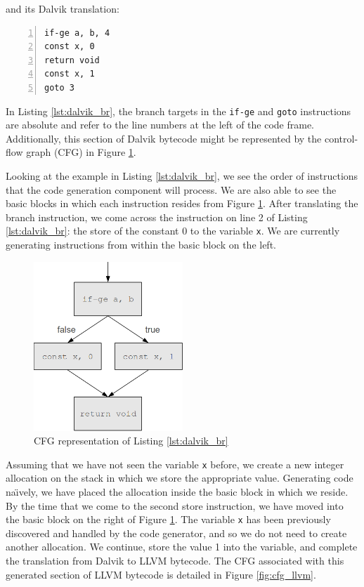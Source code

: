 and its Dalvik translation:

\lstset{
	language=Assembly,
	basicstyle=\small,
	stringstyle=\ttfamily
}

\begin{lstlisting}[frame=single, numbers=left, numberstyle=\tiny, caption={Dalvik code for Listing \ref{lst:java_br}}, label=lst:dalvik_br]
if-ge a, b, 4
const x, 0
return void
const x, 1
goto 3
\end{lstlisting}

In Listing \ref{lst:dalvik_br}, the branch targets in the \verb|if-ge| and \verb|goto| instructions are absolute and refer to the line numbers at the left of the code frame. Additionally, this section of Dalvik bytecode might be represented by the control-flow graph (CFG) in Figure \ref{fig:cfg_dalvik}.

Looking at the example in Listing \ref{lst:dalvik_br}, we see the order of instructions that the code generation component will process. We are also able to see the basic blocks in which each instruction resides from Figure \ref{fig:cfg_dalvik}. After translating the branch instruction, we come across the instruction on line 2 of Listing \ref{lst:dalvik_br}: the store of the constant 0 to the variable \verb|x|. We are currently generating instructions from within the basic block on the left.

\begin{figure}[h!]
    \centering
    \includegraphics[width=0.5\textwidth]{images/cfg_dalvik.png}
    \caption{CFG representation of Listing \ref{lst:dalvik_br}}
    \label{fig:cfg_dalvik}
\end{figure}

Assuming that we have not seen the variable \verb|x| before, we create a new integer allocation on the stack in which we store the appropriate value. Generating code na\"{\i}vely, we have placed the allocation inside the basic block in which we reside. By the time that we come to the second store instruction, we have moved into the basic block on the right of Figure \ref{fig:cfg_dalvik}. The variable \verb|x| has been previously discovered and handled by the code generator, and so we do not need to create another allocation. We continue, store the value 1 into the variable, and complete the translation from Dalvik to LLVM bytecode. The CFG associated with this generated section of LLVM bytecode is detailed in Figure \ref{fig:cfg_llvm}.

